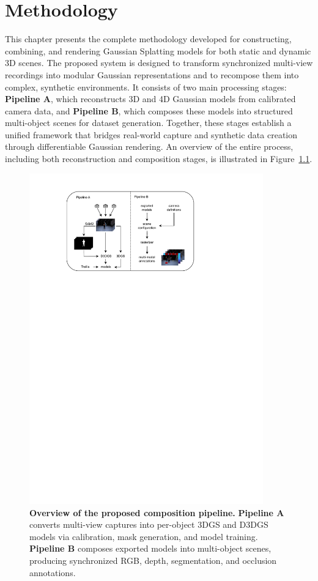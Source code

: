 \chapter{Methodology}

This chapter presents the complete methodology developed for constructing, combining, and rendering Gaussian Splatting models for both static and dynamic 3D scenes. 
The proposed system is designed to transform synchronized multi-view recordings into modular Gaussian representations and to recompose them into complex, synthetic environments. 
It consists of two main processing stages: \textbf{Pipeline A}, which reconstructs 3D and 4D Gaussian models from calibrated camera data, and \textbf{Pipeline B}, which composes these models into structured multi-object scenes for dataset generation. 
Together, these stages establish a unified framework that bridges real-world capture and synthetic data creation through differentiable Gaussian rendering. 
An overview of the entire process, including both reconstruction and composition stages, is illustrated in Figure~\ref{fig:Ablauf}.

\begin{figure}[!t]
    \centering
    \includegraphics[width=0.9\textwidth]{Grafiken/Ablauf.pdf}
    \caption{
       \textbf{Overview of the proposed composition pipeline.}
        \textbf{Pipeline A} converts multi-view captures into per-object 3DGS and D3DGS models via calibration, mask generation, and model training.
        \textbf{Pipeline B} composes exported models into multi-object scenes, producing synchronized RGB, depth, segmentation, and occlusion annotations.
    }
    \label{fig:Ablauf}
\end{figure}


